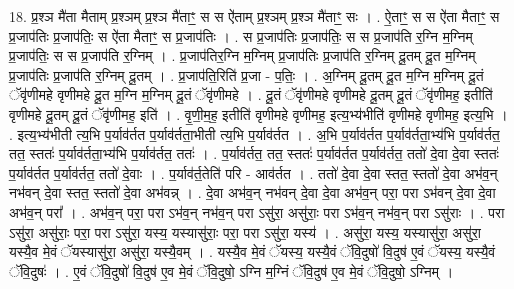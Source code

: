 \documentclass[17pt]{extarticle}
\begin{document}
18. प्र॒श्ञ मै॑ता मैताम् प्र॒श्ञम् प्र॒श्ञ मै॑ताꣳ॒॒ स स ऐ॑ताम् प्र॒श्ञम् प्र॒श्ञ मै॑ताꣳ॒॒ सः । . ऐ॒ताꣳ॒॒ स स ऐ॑ता मैताꣳ॒॒ स प्र॒जाप॑तिः प्र॒जाप॑तिः॒ स ऐ॑ता मैताꣳ॒॒ स प्र॒जाप॑तिः । . स प्र॒जाप॑तिः प्र॒जाप॑तिः॒ स स प्र॒जाप॑ति र॒ग्नि म॒ग्निम् प्र॒जाप॑तिः॒ स स प्र॒जाप॑ति र॒ग्निम् । . प्र॒जाप॑तिर॒ग्नि म॒ग्निम् प्र॒जाप॑तिः प्र॒जाप॑ति र॒ग्निम् दू॒तम् दू॒त म॒ग्निम् प्र॒जाप॑तिः प्र॒जाप॑ति र॒ग्निम् दू॒तम् । . प्र॒जाप॑ति॒रिति॑ प्र॒जा - प॒तिः॒ । . अ॒ग्निम् दू॒तम् दू॒त म॒ग्नि म॒ग्निम् दू॒तं ॅवृ॑णीमहे वृणीमहे दू॒त म॒ग्नि म॒ग्निम् दू॒तं ॅवृ॑णीमहे । . दू॒तं ॅवृ॑णीमहे वृणीमहे दू॒तम् दू॒तं ॅवृ॑णीमह॒ इतीति॑ वृणीमहे दू॒तम् दू॒तं ॅवृ॑णीमह॒ इति॑ । . वृ॒णी॒म॒ह॒ इतीति॑ वृणीमहे वृणीमह॒ इत्य॒भ्य॑भीति॑ वृणीमहे वृणीमह॒ इत्य॒भि । . इत्य॒भ्य॑भीती त्य॒भि प॒र्याव॑र्तत प॒र्याव॑र्तता॒भीती त्य॒भि प॒र्याव॑र्तत । . अ॒भि प॒र्याव॑र्तत प॒र्याव॑र्तता॒भ्य॑भि प॒र्याव॑र्तत॒ तत॒ स्ततः॑ प॒र्याव॑र्तता॒भ्य॑भि प॒र्याव॑र्तत॒ ततः॑ । . प॒र्याव॑र्तत॒ तत॒ स्ततः॑ प॒र्याव॑र्तत प॒र्याव॑र्तत॒ ततो॑ दे॒वा दे॒वा स्ततः॑ प॒र्याव॑र्तत प॒र्याव॑र्तत॒ ततो॑ दे॒वाः । . प॒र्याव॑र्त॒तेति॑ परि - आव॑र्तत । . ततो॑ दे॒वा दे॒वा स्तत॒ स्ततो॑ दे॒वा अभ॑व॒न् नभ॑वन् दे॒वा स्तत॒ स्ततो॑ दे॒वा अभ॑वन्न् । . दे॒वा अभ॑व॒न् नभ॑वन् दे॒वा दे॒वा अभ॑व॒न् परा॒ परा ऽभ॑वन् दे॒वा दे॒वा अभ॑व॒न् परा᳚ । . अभ॑व॒न् परा॒ परा ऽभ॑व॒न् नभ॑व॒न् परा ऽसु॑रा॒ असु॑राः॒ परा ऽभ॑व॒न् नभ॑व॒न् परा ऽसु॑राः । . परा ऽसु॑रा॒ असु॑राः॒ परा॒ परा ऽसु॑रा॒ यस्य॒ यस्यासु॑राः॒ परा॒ परा ऽसु॑रा॒ यस्य॑ । . असु॑रा॒ यस्य॒ यस्यासु॑रा॒ असु॑रा॒ यस्यै॒व मे॒वं ॅयस्यासु॑रा॒ असु॑रा॒ यस्यै॒वम् । . यस्यै॒व मे॒वं ॅयस्य॒ यस्यै॒वं ॅवि॒दुषो॑ वि॒दुष॑ ए॒वं ॅयस्य॒ यस्यै॒वं ॅवि॒दुषः॑ । . ए॒वं ॅवि॒दुषो॑ वि॒दुष॑ ए॒व मे॒वं ॅवि॒दुषो॒ ऽग्नि म॒ग्निं ॅवि॒दुष॑ ए॒व मे॒वं ॅवि॒दुषो॒ ऽग्निम् । \newline
\end{document}
